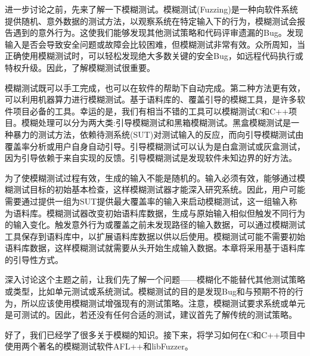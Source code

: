 进一步讨论之前，先来了解一下模糊测试。模糊测试(Fuzzing)是一种向软件系统提供随机、意外数据的测试方法，以观察系统在特定输入下的行为，模糊测试会报告遇到的意外行为。这使我们能够发现其他测试策略和代码评审遗漏的Bug。发现输入是否会导致安全问题或故障会比较困难，但模糊测试非常有效。众所周知，当正确使用模糊测试时，可以轻松发现绝大多数关键的安全Bug，如远程代码执行或特权升级。因此，了解模糊测试很重要。

模糊测试既可以手工完成，也可以在软件的帮助下自动完成。第二种方法更有效，可以利用机器算力进行模糊测试。基于语料库的、覆盖引导的模糊工具，是许多软件项目必备的工具。幸运的是，我们有相当不错的工具可以模糊测试C和C++项目。模糊处理可以分为两大类:引导模糊测试和黑箱模糊测试。黑盒模糊测试是一种暴力的测试方法，依赖待测系统(SUT)对测试输入的反应，而向引导模糊测试由覆盖率分析或用户自身自动引导。引导模糊测试可以认为是白盒测试或灰盒测试，因为引导依赖于来自实现的反馈。引导模糊测试是发现软件未知边界的好方法。

为了使模糊测试过程有效，生成的输入不能是随机的。输入必须有效，能够通过模糊测试目标的初始基本检查，这样模糊测试器才能深入研究系统。因此，用户可能需要通过提供一组为SUT提供最大覆盖率的输入来启动模糊测试，这一组输入称为语料库。模糊测试器改变初始语料库数据，生成与原始输入相似但触发不同行为的输入变化。触发意外行为或覆盖之前未发现路径的输入数据，可以通过模糊测试工具保存到语料库中，以扩展语料库数据以供以后使用。模糊测试可能不需要初始语料库数据，这样模糊测试就需要从头开始生成输入数据。本章将采用基于语料库的引导性方式。

深入讨论这个主题之前，让我们先了解一个问题——模糊化不能替代其他测试策略或类型，比如单元测试或系统测试。模糊测试的目的是发现Bug和与预期不符的行为，所以应该使用模糊测试增强现有的测试策略。注意，模糊测试要求系统或单元是可测试的。因此，若还没有任何合适的测试，建议首先了解传统的测试策略。

好了，我们已经学了很多关于模糊的知识。接下来，将学习如何在C和C++项目中使用两个著名的模糊测试软件AFL++和libFuzzer。




























